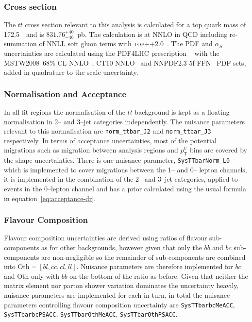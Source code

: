 \subsubsection{Cross section}

The $t\bar{t}$ cross section relevant to this analysis is calculated for a top
quark mass of 172.5~\GeV\ and is $831.76^{+40}_{-46}$~pb. The calculation is  at
NNLO in QCD including re-summation of NNLL soft gluon terms with
\textsc{top++2.0}~\cite{Beneke2012695,Cacciari2012612,PhysRevLett.109.132001,NNLOcorr,NNLOcorrNLO,PhysRevLett.110.252004,Czakon:2011xx}.
The PDF and $\alpha_S$ uncertainties are calculated using the PDF4LHC
prescription ~\cite{Botje:2011sn} with the MSTW2008~68\% CL
NNLO~\cite{PDFLHC,alphasunc}, CT10
NNLO~\cite{PhysRevD.82.074024,PhysRevD.89.033009} and NNPDF2.3 5f
FFN~\cite{Ball:2012cx} PDF sets, added in quadrature to the scale uncertainty.

\subsubsection{Normalisation and Acceptance}

In all fit regions the normalisation of the $t\bar{t}$ background is kept as a
floating normalisation in 2-- and 3--jet categories independently. The nuisance
parameters relevant to this normalisation are \texttt{norm\_ttbar\_J2} and
\texttt{norm\_ttbar\_J3} respectively. In terms of acceptance uncertainties,
most of the potential migrations such as migration between analysis regions and
$p_{\mathrm{T}}^V$ bins are covered by the shape uncertainties. There is one nuisance
parameter, \texttt{SysTTbarNorm\_L0} which is implemented to cover migrations
between the 1-- and 0-- lepton channels, it is implemented in the combination of
the 2-- and 3--jet categories, applied to events in the 0--lepton channel and
has a prior calculated using the usual formula in
equation~\ref{eq:acceptance-dr}.

\subsubsection{Flavour Composition}

Flavour composition uncertainties are derived using ratios of flavour
sub-components as for other backgrounds, however given that only the $bb$ and
$bc$ sub-components are non-negligible so the remainder of sub-components are
combined into $\text{Oth} = [bl, cc, cl, ll]$. Nuisance parameters are therefore
implemented for $bc$ and Oth only with $bb$ on the bottom of the ratio as
before. Given that neither the matrix element nor parton shower variation
dominates the uncertainty heavily, nuisance parameters are implemented for each
in turn, in total the nuisance parameters controlling flavour composition
uncertainty are \texttt{SysTTbarbcMeACC}, \texttt{SysTTbarbcPSACC},
\texttt{SysTTbarOthMeACC}, \texttt{SysTTbarOthPSACC}.

